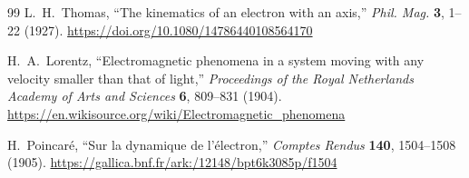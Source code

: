 \documentclass[%
 reprint,
 amsmath,amssymb,
 aps,
]{revtex4-1}
\numberwithin{equation}{section}%
\begin{document}
\begin{thebibliography}{99}
L.~H.~Thomas, 
``The kinematics of an electron with an axis,'' 
\textit{Phil. Mag.} \textbf{3}, 1--22 (1927). 
\href{https://doi.org/10.1080/14786440108564170}{https://doi.org/10.1080/14786440108564170}

H.~A.~Lorentz, 
``Electromagnetic phenomena in a system moving with any velocity smaller than that of light,'' 
\textit{Proceedings of the Royal Netherlands Academy of Arts and Sciences} \textbf{6}, 809--831 (1904).
\href{https://en.wikisource.org/wiki/Electromagnetic_phenomena}{https://en.wikisource.org/wiki/Electromagnetic\_phenomena}

H.~Poincaré, 
``Sur la dynamique de l'électron,'' 
\textit{Comptes Rendus} \textbf{140}, 1504--1508 (1905).
\href{https://gallica.bnf.fr/ark:/12148/bpt6k3085p/f1504}{https://gallica.bnf.fr/ark:/12148/bpt6k3085p/f1504}

\end{thebibliography}

\end{document}
